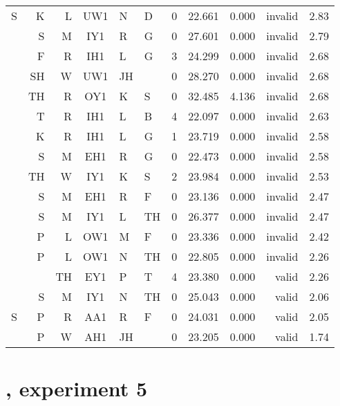 \begin{longtable}{r@{ }r@{ }r@{ }c@{ }l@{ }l@{ } rrrrr}
S &  K &  L & UW1 & N  & D  &  0 & 22.661 & 0.000 & invalid & 2.83 \\
  &  S &  M & IY1 & R  & G  &  0 & 27.601 & 0.000 & invalid & 2.79 \\
  &  F &  R & IH1 & L  & G  &  3 & 24.299 & 0.000 & invalid & 2.68 \\
  & SH &  W & UW1 & JH &    &  0 & 28.270 & 0.000 & invalid & 2.68 \\
  & TH &  R & OY1 & K  & S  &  0 & 32.485 & 4.136 & invalid & 2.68 \\
  &  T &  R & IH1 & L  & B  &  4 & 22.097 & 0.000 & invalid & 2.63 \\
  &  K &  R & IH1 & L  & G  &  1 & 23.719 & 0.000 & invalid & 2.58 \\
  &  S &  M & EH1 & R  & G  &  0 & 22.473 & 0.000 & invalid & 2.58 \\
  & TH &  W & IY1 & K  & S  &  2 & 23.984 & 0.000 & invalid & 2.53 \\
  &  S &  M & EH1 & R  & F  &  0 & 23.136 & 0.000 & invalid & 2.47 \\
  &  S &  M & IY1 & L  & TH &  0 & 26.377 & 0.000 & invalid & 2.47 \\
  &  P &  L & OW1 & M  & F  &  0 & 23.336 & 0.000 & invalid & 2.42 \\
  &  P &  L & OW1 & N  & TH &  0 & 22.805 & 0.000 & invalid & 2.26 \\
  &    & TH & EY1 & P  & T  &  4 & 23.380 & 0.000 &   valid & 2.26 \\
  &  S &  M & IY1 & N  & TH &  0 & 25.043 & 0.000 &   valid & 2.06 \\
S &  P &  R & AA1 & R  & F  &  0 & 24.031 & 0.000 &   valid & 2.05 \\
  &  P &  W & AH1 & JH &    &  0 & 23.205 & 0.000 &   valid & 1.74 \\
\bottomrule
\end{longtable}

\section{\citet{Scholes1966}, experiment 5}    

